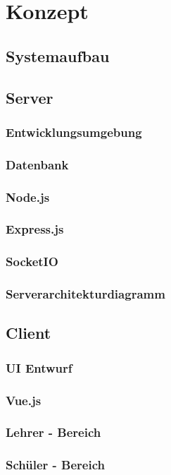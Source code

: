 \section{Konzept}\label{sec:konzept}

\subsection{Systemaufbau}\label{sec:sysaufbau}
\subsection{Server}\label{sec:serverkonzept}
\subsubsection{Entwicklungsumgebung}\label{sec:umgebung}
\subsubsection{Datenbank}\label{sec:datenbank}
\subsubsection{Node.js}\label{sec:nodejs}
\subsubsection{Express.js}\label{sec:expressjs}
\subsubsection{SocketIO}\label{sec:socketio}
\subsubsection{Serverarchitekturdiagramm}\label{sec:serverarchitekt}
\subsection{Client}\label{sec:clientkonzept}
\subsubsection{UI Entwurf}\label{sec:uientwurf}
\subsubsection{Vue.js}\label{sec:vuejs}
\subsubsection{Lehrer - Bereich}\label{sec:lehrerbereich}
\subsubsection{Schüler - Bereich}\label{sec:schuelerbereich}